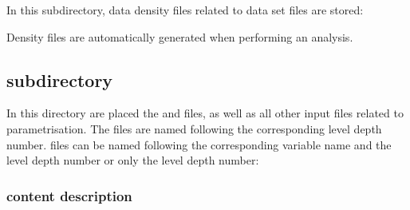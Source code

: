In this subdirectory, data density files related to data set files are stored:

\begin{center}
\end{center}


\btips

Density files are automatically generated when performing an analysis.

\etips

\subsection[DIVA3D/divastripped/input/divaparam subdirectory]{ subdirectory}

In this directory are placed the   and  files, as well as all other input files related to \diva parametrisation. The   files are named following the corresponding level depth number.  files can be named following the  corresponding variable name and the level depth number or only the level depth number:


\begin{center}
\end{center}



\subsubsection[input/divaparam content description]{ content description}

